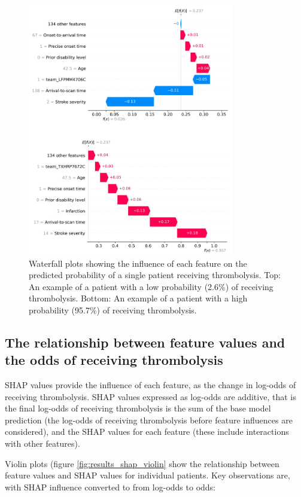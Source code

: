 \begin{figure}
\centering
\includegraphics[width=0.8\textwidth]{./images/waterfall}
\caption{Waterfall plots showing the influence of each feature on the predicted probability of a single patient receiving thrombolysis. Top: An example of a patient with a low probability (2.6\%) of receiving thrombolysis. Bottom: An example of a patient with a high probability (95.7\%) of receiving thrombolysis.}
\label{fig:results_waterfall}
\end{figure}

\subsection{The relationship between feature values and the odds of receiving thrombolysis}

SHAP values provide the influence of each feature, as the change in log-odds of receiving thrombolysis. SHAP values expressed as log-odds are additive, that is the final log-odds of receiving thrombolysis is the sum of the base model prediction (the log-odds of receiving thrombolysis before feature influences are considered), and the SHAP values for each feature (these include interactions with other features).

Violin plots (figure \ref{fig:results_shap_violin} show the relationship between feature values and SHAP values for individual patients. Key observations are, with SHAP influence converted to from log-odds to odds:

